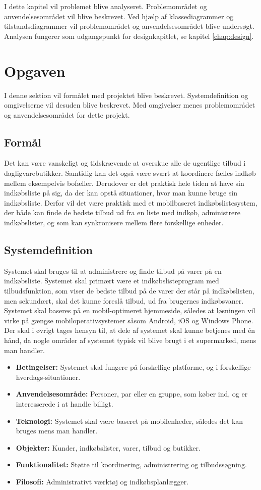 I dette kapitel vil problemet blive analyseret. Problemområdet og anvendelsesområdet vil blive beskrevet. Ved hjælp af klassediagrammer og tilstandsdiagrammer vil problemområdet og anvendelsesområdet blive undersøgt. Analysen fungerer som udgangspunkt for designkapitlet, se kapitel \ref{chap:design}.

\section{Opgaven}
I denne sektion vil formålet med projektet blive beskrevet. Systemdefinition og omgivelserne vil desuden blive beskrevet. Med omgivelser menes problemområdet og anvendelsesområdet for dette projekt.

\subsection{Formål}
Det kan være vanskeligt og tidskrævende at overskue alle de ugentlige tilbud i dagligvarebutikker. Samtidig kan det også være svært at koordinere fælles indkøb mellem eksempelvis bofæller. Derudover er det praktisk hele tiden at have sin indkøbsliste på sig, da der kan opstå situationer, hvor man kunne bruge sin indkøbsliste. Derfor vil det være praktisk med et mobilbaseret indkøbslistesystem, der både kan finde de bedste tilbud ud fra en liste med indkøb, administrere indkøbslister, og som kan synkronisere mellem flere forskellige enheder. 

\subsection{Systemdefinition}
Systemet skal bruges til at administrere og finde tilbud på varer på en indkøbsliste. Systemet skal primært være et indkøbslisteprogram med tilbudsfunktion, som viser de bedste tilbud på de varer der står på indkøbslisten, men sekundært, skal det kunne foreslå tilbud, ud fra brugernes indkøbsvaner.  Systemet skal baseres på en mobil-optimeret hjemmeside, således at løsningen vil virke på gængse mobiloperativsystemer såsom Android, iOS og Windows Phone. Der skal i øvrigt tages hensyn til, at dele af systemet skal kunne betjenes med én hånd, da nogle områder af systemet typisk vil blive brugt i et supermarked, mens man handler. 

\begin{itemize}
\item \textbf{Betingelser:} Systemet skal fungere på forskellige platforme, og i forskellige hverdags-situationer.
\item \textbf{Anvendelsesområde:} Personer, par eller en gruppe, som køber ind, og er interesserede i at handle billigt.
\item \textbf{Teknologi:} Systemet skal være baseret på mobilenheder, således det kan bruges mens man handler.
\item \textbf{Objekter:} Kunder, indkøbslister, varer, tilbud og butikker.
\item \textbf{Funktionalitet:} Støtte til koordinering, administrering og tilbudssøgning.
\item \textbf{Filosofi:} Administrativt værktøj og indkøbsplanlægger.
\end{itemize}

